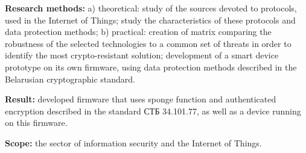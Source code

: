 \textbf{Research methods:} a) theoretical: study of the sources devoted to protocols, used in the 
Internet of Things; study the characteristics of these protocols and data protection methods; 
b) practical: creation of matrix comparing the robustness of the selected technologies to a common 
set of threats in order to identify the most crypto-resistant solution; development 
of a smart device prototype on its own firmware, using data protection methods described in the Belarusian 
cryptographic standard.

\textbf{Result:} developed firmware that uses sponge function and authenticated encryption described 
in the standard СТБ 34.101.77, as well as a device running on this firmware.

\textbf{Scope:} the sector of information security and the Internet of Things.
